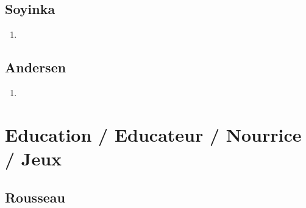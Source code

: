 \documentclass[a4paper, 11pt, hidelinks]{article}
\begin{document}
\subsection{Soyinka}


\begin{enumerate}
    \item 
\end{enumerate}




\subsection{Andersen}


\begin{enumerate}
    \item 
\end{enumerate}


















































\section{Education / Educateur / Nourrice / Jeux}



\subsection{Rousseau}
\end{document}
